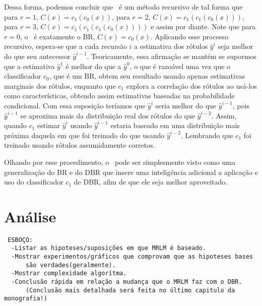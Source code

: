  Dessa forma, podemos concluir que \MRLM~é um método recursivo de tal forma que
 para $r=1$, $C(x)=c_1(c_0(x))$,
 para $r=2$, $C(x)=c_1(c_1(c_0(x)))$,
 para $r=3$, $C(x)=c_1(c_1(c_1(c_0(x))))$ e assim por diante.
 Note que para $r=0$, o \MRLMa~é exatamente o BR, $C(x)=c_0(x)$.
 Aplicando esse processo recursivo, espera-se que a cada recursão $i$ a estimativa dos rótulos $\hat{y}^i$ seja melhor do que
 seu antecessor $\hat{y}^{i-1}$. Teoricamente, essa afirmação se mantém se supormos que a estimativa $\hat{y}^1$ é melhor do que a $\hat{y}^0$, 
 o que é razoável uma vez que o classificador $c_0$, que é um BR, obtem seu resultado usando apenas estimativas marginais dos rótulos,
  enquanto que $c_1$ explora a correlação dos rótulos ao usá-los como características, obtendo assim 
 estimativas baseadas na probabilidade condicional.
 Com essa suposição teríamos que $\hat{y}^i$ seria melhor do que $\hat{y}^{i-1}$, pois $\hat{y}^{i-1}$ se aproxima
 mais da distribuição real dos rótulos do que $\hat{y}^{i-2}$. Assim, quando $c_1$ estimar $\hat{y}^i$ usando $\hat{y}^{i-1}$ estaria baseado em 
 uma distribuição mais próxima daquela em que foi treinado do que usando $\hat{y}^{i-2}$.
 Lembrando que $c_1$ foi treinado usando rótulos assumidamente corretos.
 
 Olhando por esse procedimento, o \MRLMa~pode ser simplesmente visto como uma generalização do BR e do DBR
 que insere uma inteligência
 adicional a aplicação e uso do classificador $c_1$ de DBR, afim de que ele seja melhor aproveitado.
 
 
 
 \section{Análise}
 \label{sec:mrlm_analise}
 \begin{verbatim}
 ESBOÇO:
  -Listar as hipoteses/suposições em que MRLM é baseado.
  -Mostrar experimentos/gráficos que comprovam que as hipoteses bases
      são verdades(geralmente).
  -Mostrar complexidade algorítma.
  -Conclusão rápida em relação a mudança que o MRLM faz com o DBR.
      (Conclusão mais detalhada será feita no último capitulo da monografia!)
 \end{verbatim}
 
